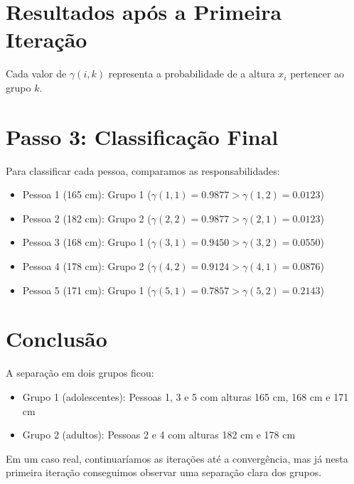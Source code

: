 \documentclass{article}
\begin{document}
\section{Resultados após a Primeira Iteração}

Cada valor de $\gamma(i,k)$ representa a probabilidade de a altura $x_i$ pertencer ao grupo $k$.

\section{Passo 3: Classificação Final}
Para classificar cada pessoa, comparamos as responsabilidades:

\begin{itemize}
    \item Pessoa 1 (165 cm): Grupo 1 ($\gamma(1,1) = 0.9877 > \gamma(1,2) = 0.0123$)
    \item Pessoa 2 (182 cm): Grupo 2 ($\gamma(2,2) = 0.9877 > \gamma(2,1) = 0.0123$)
    \item Pessoa 3 (168 cm): Grupo 1 ($\gamma(3,1) = 0.9450 > \gamma(3,2) = 0.0550$)
    \item Pessoa 4 (178 cm): Grupo 2 ($\gamma(4,2) = 0.9124 > \gamma(4,1) = 0.0876$)
    \item Pessoa 5 (171 cm): Grupo 1 ($\gamma(5,1) = 0.7857 > \gamma(5,2) = 0.2143$)
\end{itemize}

\section{Conclusão}
A separação em dois grupos ficou:
\begin{itemize}
    \item Grupo 1 (adolescentes): Pessoas 1, 3 e 5 com alturas 165 cm, 168 cm e 171 cm
    \item Grupo 2 (adultos): Pessoas 2 e 4 com alturas 182 cm e 178 cm
\end{itemize}

Em um caso real, continuaríamos as iterações até a convergência, mas já nesta primeira iteração conseguimos observar uma separação clara dos grupos.
\end{document}
